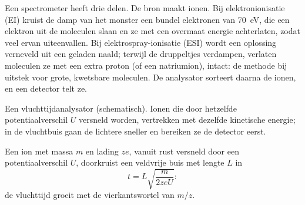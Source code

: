 Een spectrometer heeft drie delen. De bron maakt ionen. Bij elektronionisatie (EI) kruist de damp van het
monster een bundel elektronen van \qty{70}{eV}, die een elektron uit de moleculen slaan en ze
met een overmaat energie achterlaten, zodat veel ervan uiteenvallen. Bij elektrospray-ionisatie (ESI) wordt een oplossing
verneveld uit een geladen naald; terwijl de druppeltjes verdampen, verlaten moleculen ze met een extra proton
(of een natriumion), intact: de methode bij uitstek voor grote, kwetsbare moleculen. De analysator sorteert daarna
de ionen, en een detector telt ze.

\begin{omfigure}
\par\vspace{4pt}

{\small Een vluchttijdanalysator (schematisch). Ionen die door hetzelfde potentiaalverschil
$U$ versneld worden, vertrekken met dezelfde kinetische energie; in de vluchtbuis gaan de lichtere sneller en bereiken ze de
detector eerst.}
\end{omfigure}

\begin{proposition}[Vluchttijd]\label{prop:b2:mass-spec-atomic:time-of-flight}
Een ion met massa $m$ en lading $ze$, vanuit rust versneld door een potentiaalverschil $U$, doorkruist een
veldvrije buis met lengte $L$ in
\begin{equation*}
t = L\sqrt{\frac{m}{2zeU}}:
\end{equation*}
de vluchttijd groeit met de vierkantswortel van $m/z$.
\end{proposition}

